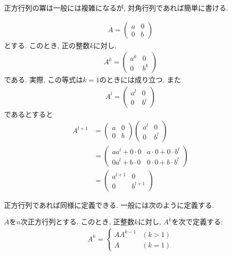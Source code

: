正方行列の冪は一般には複雑になるが,
対角行列であれば簡単に書ける.
\begin{example}
  \label{eg:diag:power}
  \begin{align*}
    A=\begin{pmatrix}a&0\\0&b\end{pmatrix}
  \end{align*}
  とする. このとき, 正の整数$k$に対し,
  \begin{align*}
    A^k=\begin{pmatrix}a^k&0\\0&b^k\end{pmatrix}
  \end{align*}
  である.
  実際, この等式は$k=1$のときには成り立つ.
  また
  \begin{align*}
    A^l=\begin{pmatrix}a^{l}&0\\0&b^{l} \end{pmatrix}
  \end{align*}
  であるとすると
  \begin{align*}
    A^{l+1}
    &=
    \begin{pmatrix}a&0\\0&b\end{pmatrix}
      \begin{pmatrix}a^{l}&0\\0&b^{l} \end{pmatrix}
\\
      &=
\begin{pmatrix}aa^{l}+0\cdot 0&a\cdot 0+0\cdot b^l\\
  0a^{l}+b\cdot 0&0\cdot 0+b\cdot b^l
\end{pmatrix}    
\\
&=\begin{pmatrix}a^{l+1}&0\\0&b^{l+1} \end{pmatrix}
\end{align*}
\end{example}

正方行列であれば同様に定義できる.
一般には次のように定義する.
\begin{definition}
  \label{def:op:pow}
  $A$を$n$次正方行列とする.
  このとき, 正整数$k$に対し, $A^k$を次で定義する:
  \begin{align*}
    A^k=
    \begin{cases}
      AA^{k-1} &(k>1)\\
      A&(k=1)
    \end{cases}
  \end{align*}
\end{definition}

